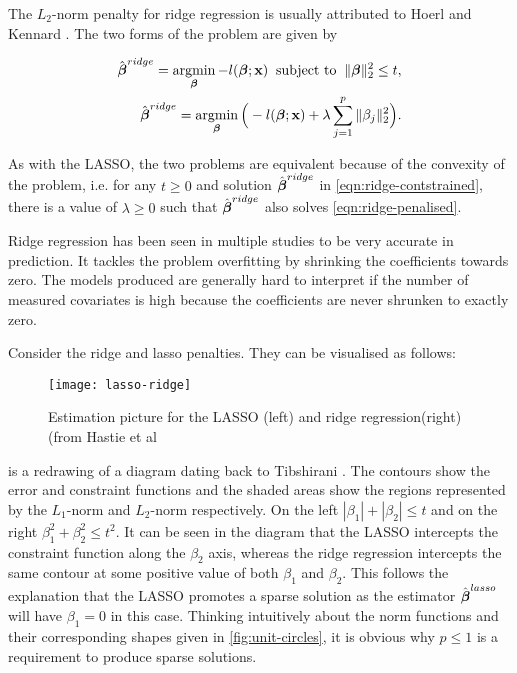 The $L_2$-norm penalty for ridge regression is usually attributed to Hoerl and Kennard . The two forms of the problem are given by

\begin{align}
    \hat{\boldsymbol{\beta}}^{ridge} =\operatorname*{argmin}_{\boldsymbol{\beta}} -l(\boldsymbol{\beta};\textbf{x})\;\;\textrm{subject to}\;\;\Vert\boldsymbol{\beta}\Vert_2^2\leq t,\label{eqn:ridge-contstrained}\\
    \hat{\boldsymbol{\beta}}^{ridge} = \operatorname*{argmin}_{\boldsymbol{\beta}}\Big(-l(\boldsymbol{\beta};\textbf{x})+\lambda\sum_{j=1}^p\Vert\beta_j\Vert_2^2\Big)\label{eqn:ridge-penalised}.
\end{align}

As with the LASSO, the two problems are equivalent because of the convexity of the problem, i.e. for any $t\geq 0$ and solution $\hat{\boldsymbol{\beta}}^{ridge}$ in \cref{eqn:ridge-contstrained}, there is a value of $\lambda\geq0$ such that $\hat{\boldsymbol{\beta}}^{ridge}$ also solves \cref{eqn:ridge-penalised}.

Ridge regression has been seen in multiple studies to be very accurate in prediction. It tackles the problem overfitting by shrinking the coefficients towards zero. The models produced are generally hard to interpret if the number of measured covariates is high because the coefficients are never shrunken to exactly zero.

Consider the ridge and lasso penalties. They can be visualised as follows:

\begin{figure}[ht!]
  \texttt{[image: lasso-ridge]}
  \caption{Estimation picture for the LASSO (left) and ridge regression(right) (from Hastie et al }
  \label{fig:lasso-ridge}
\end{figure}

 is a redrawing of a diagram dating back to Tibshirani . The contours show the error and constraint functions and the shaded areas show the regions represented by the $L_1$-norm and $L_2$-norm respectively. On the left $|\beta_1|+|\beta_2|\leq t$ and on the right $\beta_1^2+\beta_2^2\leq t^2$. It can be seen in the diagram that the LASSO intercepts the constraint function along the $\beta_2$ axis, whereas the ridge regression intercepts the same contour at some positive value of both $\beta_1$ and $\beta_2$. This follows the explanation that the LASSO promotes a sparse solution as the estimator $\hat{\boldsymbol{\beta}}^{lasso}$ will have $\beta_1=0$ in this case. Thinking intuitively about the norm functions and their corresponding shapes given in \cref{fig:unit-circles}, it is obvious why $p\leq 1$ is a requirement to produce sparse solutions.

